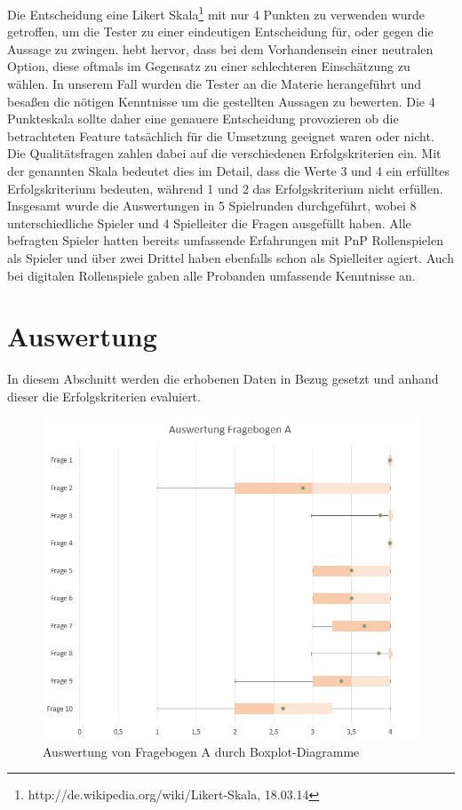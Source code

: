 Die Entscheidung eine Likert Skala\footnote{http://de.wikipedia.org/wiki/Likert-Skala, 18.03.14} mit nur 4 Punkten zu verwenden wurde getroffen, um die Tester zu einer eindeutigen Entscheidung für, oder gegen die Aussage zu zwingen. \cite{Garland1991} hebt hervor, dass bei dem Vorhandensein einer neutralen Option, diese oftmals im Gegensatz zu einer schlechteren Einschätzung zu wählen. In unserem Fall wurden die Tester an die Materie herangeführt und besaßen die nötigen Kenntnisse um die gestellten Aussagen zu bewerten. Die 4 Punkteskala sollte daher eine genauere Entscheidung provozieren ob die betrachteten Feature tatsächlich für die Umsetzung geeignet waren oder nicht.
Die Qualitätsfragen zahlen dabei auf die verschiedenen Erfolgskriterien ein. Mit der genannten Skala bedeutet dies im Detail, dass die Werte 3 und 4 ein erfülltes Erfolgskriterium bedeuten, während 1 und 2 das Erfolgskriterium nicht erfüllen. \newline
Insgesamt wurde die Auswertungen in 5 Spielrunden durchgeführt, wobei 8 unterschiedliche Spieler und 4 Spielleiter die Fragen ausgefüllt haben. Alle befragten Spieler hatten bereits umfassende Erfahrungen mit PnP Rollenspielen als Spieler und über zwei Drittel haben ebenfalls schon als Spielleiter agiert. Auch bei digitalen Rollenspiele gaben alle Probanden umfassende Kenntnisse an. 



\section{Auswertung}
\label{sec:Auswertung}

In diesem Abschnitt werden die erhobenen Daten in Bezug gesetzt und anhand dieser die Erfolgskriterien evaluiert.

\begin{figure}[h!]
	\centering
		\includegraphics[width=1.00\textwidth]{media/Auswertung.png}
	\caption{Auswertung von Fragebogen A durch Boxplot-Diagramme}
	\label{fig:Auswertung}
\end{figure}



